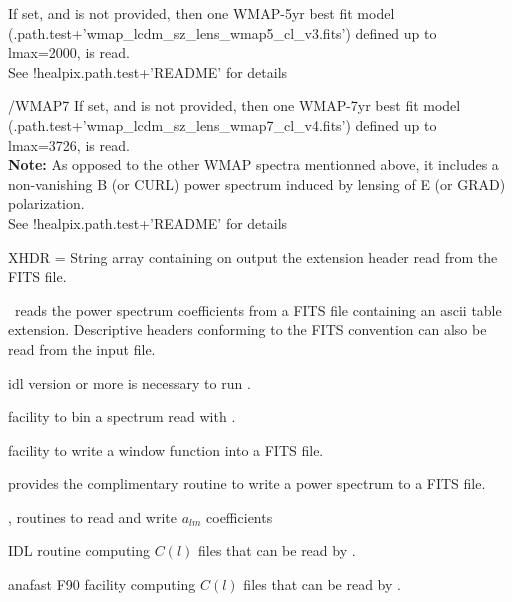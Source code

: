 \begin{keywords}
\begin{kwlist}{}
           If set, and 
           is not provided, then one WMAP-5yr best fit
          model (.path.test+\-'wmap\_lcdm\_sz\_lens\_wmap5\_cl\_v3.fits') 
          defined up to lmax=2000, is read.\\
          See !healpix.path.test+'README' for details
%
    \item[/WMAP7] %
           If set, and 
           is not provided, then one WMAP-7yr best fit
          model (.path.test+\-'wmap\_lcdm\_sz\_lens\_wmap7\_cl\_v4.fits') 
          defined up to lmax=3726, is read.\\
          {\bf Note:} As opposed to the other WMAP spectra mentionned above, it includes
             a non-vanishing B (or CURL) power spectrum 
             induced by lensing of E (or GRAD) polarization.\\
          See !healpix.path.test+'README' for details
%
    \item[XHDR =] %
	String array containing on output the extension header
      read from the FITS file. 
  \end{kwlist}
\end{keywords}  

\begin{codedescription}
{\thedocid\ reads the power spectrum coefficients from a FITS
file containing an ascii table extension. Descriptive headers conforming
to the FITS convention can also be read from the input file.
}
\end{codedescription}



\begin{related}
  \begin{sulist}{} %
    \item[idl] version \idlversion or more is necessary to run \thedocid.
    \item[\htmlref{bin\_llcl}{idl:bin_llcl}] facility to bin a spectrum read
with \thedocid.
    \item[\htmlref{bl2fits}{idl:bl2fits}] facility to write a window function into a FITS file.
    \item[\htmlref{cl2fits}{idl:cl2fits}] provides the complimentary routine to write a
      power spectrum to a FITS file.
    \item[\htmlref{fits2alm}{idl:fits2alm}, \htmlref{alm2fits}{idl:alm2fits}] routines to read and write $a_{lm}$ coefficients
    \item[\htmlref{ianafast}{idl:ianafast}] IDL routine computing $C(l)$ files
that can be read by \thedocid.
    \item[anafast] F90 facility computing $C(l)$ files that can be read by \thedocid.
  \end{sulist}
\end{related}

